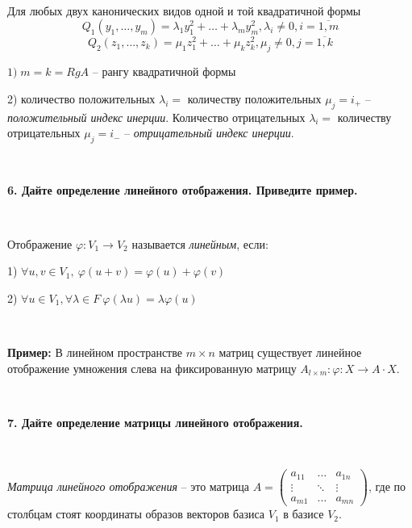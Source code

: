 \documentclass{article}
\begin{document}
    {
        $\;$
        \setlength{\parindent}{0.4cm}
        \hangindent=0.4cm

    Для любых двух канонических видов одной и той квадратичной формы
        $$Q_1(y_1, \ldots, y_m)=\lambda_1y_1^2+\ldots+\lambda_my_m^2, \lambda_i\ne0, i=\overline{1, m}$$
        $$Q_2(z_1, \ldots, z_k)=\mu_1z_1^2+\ldots+\mu_kz_k^2, \mu_j\ne0, j=\overline{1, k}$$

        $1)\; m=k=RgA$ -- рангу квадратичной формы

    2) количество положительных $\lambda_i=$ количеству положительных $\mu_j=i_+$ -- \textit{положительный индекс инерции}. Количество отрицательных $\lambda_i=$ количеству отрицательных $\mu_j=i_-$ -- \textit{отрицательный индекс инерции}.

        $\;$
        \setlength{\parindent}{0cm}
        \hangindent=0cm
    }

    \newpage

    \textbf{6. Дайте определение линейного отображения. Приведите пример.}

    {
        $\;$
        \setlength{\parindent}{0.4cm}
        \hangindent=0.4cm

    Отображение $\varphi: V_1\rightarrow V_2$ называется \textit{линейным}, если:

    1) $\forall u, v\in V_1, \ \varphi(u+v)=\varphi(u)+\varphi(v)$

        2) $\forall u\in V_1, \forall \lambda\in F\ \varphi(\lambda u)=\lambda\varphi(u)$

        $\;$

        \textbf{Пример:} В линейном пространстве $m\times n$ матриц существует линейное отображение умножения слева на фиксированную матрицу $A_{l\times m}: \varphi:X\rightarrow A\cdot X$.

        $\;$
        \setlength{\parindent}{0cm}
        \hangindent=0cm
    }

    \textbf{7. Дайте определение матрицы линейного отображения.}

    {
        $\;$
        \setlength{\parindent}{0.4cm}
        \hangindent=0.4cm

    \textit{Матрица линейного отображения} -- это матрица $A=\begin{pmatrix}
                                                                 a_{11} & \ldots & a_{1n} \\
                                                                 \vdots & \ddots & \vdots \\
                                                                 a_{m1} & \ldots & a_{mn}
    \end{pmatrix}$, где по столбцам стоят координаты образов векторов базиса $V_1$ в базисе $V_2$.

        $\;$
        \setlength{\parindent}{0cm}
        \hangindent=0cm
    }
\end{document}
